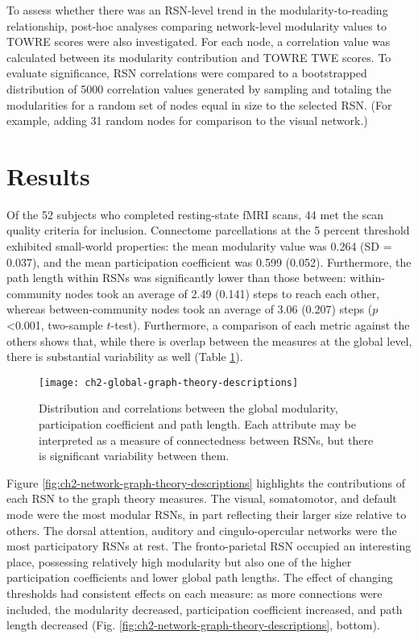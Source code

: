 To assess whether there was an RSN-level trend in the modularity-to-reading relationship, post-hoc analyses comparing network-level modularity values to TOWRE scores were also investigated. For each node, a correlation value was calculated between its modularity contribution and TOWRE TWE scores. To evaluate significance, RSN correlations were compared to a bootstrapped distribution of 5000 correlation values generated by sampling and totaling the modularities for a random set of nodes equal in size to the selected RSN. (For example, adding 31 random nodes for comparison to the visual network.)


\section{Results} 

Of the 52 subjects who completed resting-state fMRI scans, 44 met the scan quality criteria for inclusion. Connectome parcellations at the 5 percent threshold exhibited small-world properties: the mean modularity value was 0.264 (SD = 0.037), and the mean participation coefficient was 0.599 (0.052). Furthermore, the path length within RSNs was significantly lower than those between: within-community nodes took an average of 2.49 (0.141) steps to reach each other, whereas between-community nodes took an average of 3.06 (0.207) steps ($p$ \textless 0.001, two-sample $t$-test). Furthermore, a comparison of each metric against the others shows that, while there is overlap between the measures at the global level, there is substantial variability as well (Table \ref{fig:ch2-global-graph-theory-descriptions}).

\begin{figure}[t]
    \centering
    \texttt{[image: ch2-global-graph-theory-descriptions]}
    \caption[Distribution and correlations between global graph theory measures.]{Distribution and correlations between the global modularity, participation coefficient and path length. Each attribute may be interpreted as a measure of connectedness between RSNs, but there is significant variability between them.}
    \label{fig:ch2-global-graph-theory-descriptions}
\end{figure}

Figure \ref{fig:ch2-network-graph-theory-descriptions} highlights the contributions of each RSN to the graph theory measures. The visual, somatomotor, and default mode were the most modular RSNs, in part reflecting their larger size relative to others. The dorsal attention, auditory and cingulo-opercular networks were the most participatory RSNs at rest. The fronto-parietal RSN occupied an interesting place, possessing relatively high modularity but also one of the higher participation coefficients and lower global path lengths. The effect of changing thresholds had consistent effects on each measure: as more connections were included, the modularity decreased, participation coefficient increased, and path length decreased (Fig.  \ref{fig:ch2-network-graph-theory-descriptions}, bottom). 

